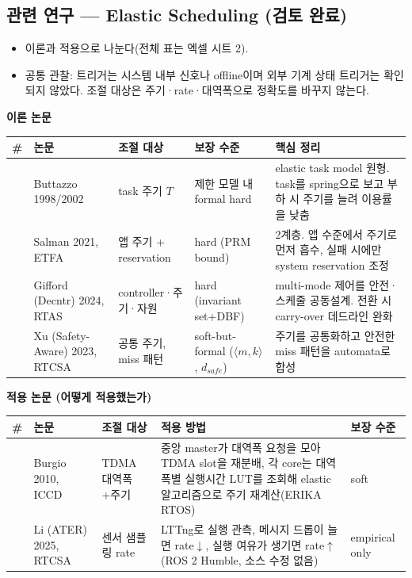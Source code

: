 \documentclass[10pt]{article}
\begin{document}
\subsection{관련 연구 --- Elastic Scheduling (검토 완료)}
\begin{itemize}
\item 이론과 적용으로 나눈다(전체 표는 엑셀 시트 2).
\item 공통 관찰: 트리거는 시스템 내부 신호나 offline이며 외부 기계 상태 트리거는 확인되지 않았다. 조절 대상은 주기·rate·대역폭으로 정확도를 바꾸지 않는다.
\end{itemize}
\noindent\textbf{이론 논문}
\begin{center}\scriptsize
\begin{tabular}{@{}cL{2.4cm}L{2.6cm}L{2.4cm}L{5.4cm}@{}}
\toprule
\# & 논문 & 조절 대상 & 보장 수준 & 핵심 정리 \\ \midrule
[9] & Buttazzo 1998/2002 & task 주기 $T$ & 제한 모델 내 formal hard & elastic task model 원형. task를 spring으로 보고 부하 시 주기를 늘려 이용률을 낮춤 \\
[10] & Salman 2021, ETFA & 앱 주기 + reservation & hard (PRM bound) & 2계층. 앱 수준에서 주기로 먼저 흡수, 실패 시에만 system reservation 조정 \\
[11] & Gifford (Decntr) 2024, RTAS & controller·주기·자원 & hard (invariant set+DBF) & multi-mode 제어를 안전·스케줄 공동설계. 전환 시 carry-over 데드라인 완화 \\
[12] & Xu (Safety-Aware) 2023, RTCSA & 공통 주기, miss 패턴 & soft-but-formal ($\langle m,k\rangle$, $d_{safe}$) & 주기를 공통화하고 안전한 miss 패턴을 automata로 합성 \\
\bottomrule
\end{tabular}
\end{center}
\noindent\textbf{적용 논문 (어떻게 적용했는가)}
\begin{center}\scriptsize
\begin{tabular}{@{}cL{2.2cm}L{2.4cm}L{6.0cm}L{2.4cm}@{}}
\toprule
\# & 논문 & 조절 대상 & 적용 방법 & 보장 수준 \\ \midrule
[13] & Burgio 2010, ICCD & TDMA 대역폭+주기 & 중앙 master가 대역폭 요청을 모아 TDMA slot을 재분배, 각 core는 대역폭별 실행시간 LUT를 조회해 elastic 알고리즘으로 주기 재계산(ERIKA RTOS) & soft \\
[14] & Li (ATER) 2025, RTCSA & 센서 샘플링 rate & LTTng로 실행 관측, 메시지 드롭이 늘면 rate$\downarrow$, 실행 여유가 생기면 rate$\uparrow$(ROS 2 Humble, 소스 수정 없음) & empirical only \\
\bottomrule
\end{tabular}
\end{center}
\end{document}
